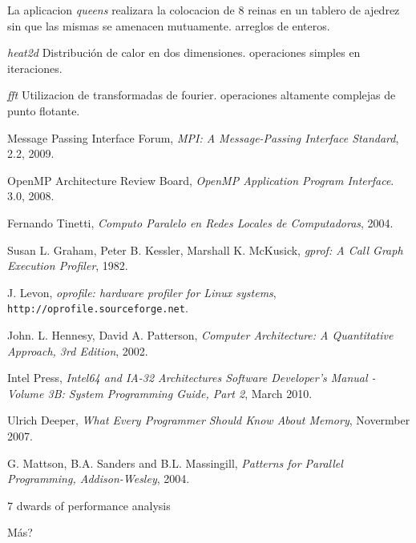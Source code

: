 \documentclass[a4paper,twocolumn]{article}
\begin{document}
La aplicacion \emph{queens} realizara la colocacion de 8 reinas en un tablero de ajedrez sin que las mismas se amenacen mutuamente.
arreglos de enteros.

\emph{heat2d} Distribuci\'on de calor en dos dimensiones.
operaciones simples en iteraciones.

\emph{fft} Utilizacion de transformadas de fourier.
operaciones altamente complejas de punto flotante.

\begin{thebibliography}{9}
  
  Message Passing Interface Forum,
  \emph{MPI: A Message-Passing Interface Standard},
  2.2,
  2009.

  OpenMP Architecture Review Board,
  \emph{OpenMP Application Program Interface}.
  3.0,
  2008.

  Fernando Tinetti,
  \emph{Computo Paralelo en Redes Locales de Computadoras},
  2004.

 Susan L. Graham,  Peter B. Kessler,  Marshall K. McKusick,
 \emph{gprof: A Call Graph Execution Profiler},
 1982.

J. Levon,
\emph{oprofile: hardware profiler for Linux systems},
{\tt http://oprofile.sourceforge.net}.

 John. L. Hennesy, David A. Patterson,
 \emph{Computer Architecture: A Quantitative Approach, 3rd Edition},
 2002.

 Intel Press,
 \emph{Intel64 and IA-32 Architectures Software Developer's Manual - Volume 3B: System Programming Guide, Part 2},
 March 2010.

 Ulrich Deeper,
 \emph{What Every Programmer Should Know About Memory},
 Novermber 2007.

 G. Mattson, B.A. Sanders and B.L. Massingill, 
 \emph{Patterns for Parallel Programming, Addison-Wesley},
 2004.

7 dwards of performance analysis

M\'as?

\end{thebibliography}
\end{document}
